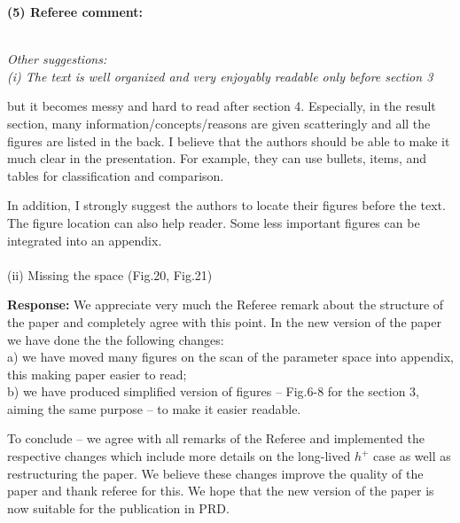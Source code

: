 \documentclass[11pt]{article}
\begin{document}

\bigskip
\noindent
{\bf (5) Referee comment:} {\it  \\
Other suggestions:
\\
(i) The text is well organized and very enjoyably readable only before
section 3

but it becomes messy and hard to read after section 4. Especially, in
the result section, many information/concepts/reasons are given
scatteringly and all the figures are listed in the back. I believe
that the authors should be able to make it much clear in the
presentation. For example, they can use bullets, items, and tables for
classification and comparison.

In addition, I strongly suggest the authors to locate their figures
before the text. The figure location can also help reader. Some less
important figures can be integrated into an appendix.
\\
\\
(ii) Missing the space (Fig.20, Fig.21)
}
\bigskip

{\bf Response:} 
We appreciate very much the Referee remark about the structure of the paper 
and completely agree with this point.
In the new version of the paper we have done the the following changes:
\\
a)  we have moved many figures on the scan of the parameter space into appendix, this making paper easier to read;
\\
b) we have produced simplified version of figures -- Fig.6-8
for the section 3,  aiming the same purpose -- to make it easier readable.

\bigskip

To conclude -- we agree with all remarks of the Referee
and implemented the respective changes which include   more details on the long-lived 
$h^+$ case as well as restructuring the paper. We believe these changes improve the quality of the paper and thank referee for this.
We hope that the new version of the paper is now suitable for the publication in PRD.
\end{document}

